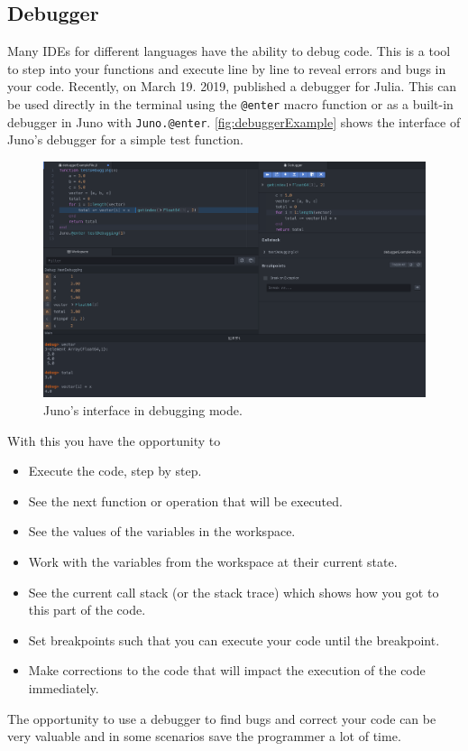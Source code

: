 \subsection{Debugger}
\label{sec:debugger}
Many IDEs for different languages have the ability to debug code. This is a tool to step into your functions and execute line by line to reveal errors and bugs in your code. Recently, on March 19. 2019, \citet{Debugger} published a debugger for Julia. This can be used directly in the terminal using the \texttt{@enter} macro function or as a built-in debugger in Juno with \texttt{Juno.@enter}. \autoref{fig:debuggerExample} shows the interface of Juno's debugger for a simple test function.
\begin{figure}[b]
    \centering
    \includegraphics[width = \textwidth]{figures/debugger_screenshot.png}
    \caption{Juno's interface in debugging mode.}
    \label{fig:debuggerExample}
\end{figure}
With this you have the opportunity to
\begin{itemize}
    \item Execute the code, step by step.
    \item See the next function or operation that will be executed.
    \item See the values of the variables in the workspace.
    \item Work with the variables from the workspace at their current state.
    \item See the current call stack (or the stack trace) which shows how you got to this part of the code.
    \item Set breakpoints such that you can execute your code until the breakpoint.
    \item Make corrections to the code that will impact the execution of the code immediately.
\end{itemize}
The opportunity to use a debugger to find bugs and correct your code can be very valuable and in some scenarios save the programmer a lot of time. 

